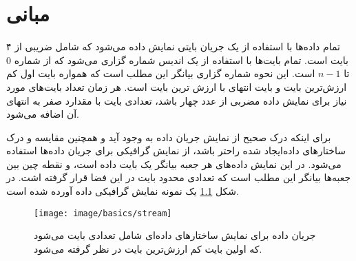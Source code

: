 \chapter{مبانی}

% 

تمام داده‌ها با استفاده از یک جریان بایتی نمایش داده می‌شود که شامل ضریبی از ۴
بایت است.
تمام بایت‌ها با استفاده از یک اندیس شماره گزاری می‌شود که از شماره $0$ تا $n-1$
است.
این نحوه شماره گزاری بیانگر این مطلب است که همواره بایت اول کم ارزش‌ترین بایت
و بایت انتهای با ارزش ترین بایت است.
هر زمان تعداد بایت‌های مورد نیاز برای نمایش داده مضربی از عدد چهار باشد، تعدادی
بایت با مقدارد صفر به انتهای آن اضافه می‌شود.
 

برای اینکه درک صحیح از نمایش جریان داده به وجود آید و همچنین مقایسه و درک
ساختارهای داده‌ایجاد شده راحتر باشد، از نمایش گرافیکی برای جریان داده‌ها استفاده
می‌شود.
در این نمایش داده‌های هر جعبه بیانگر یک بایت داده است،  و نقطه چین بین جعبه‌ها
بیانگر این مطلب است که تعدادی محدود بایت در این فضا قرار گرفته اشت.
در شکل \ref{image/basics/stream} یک نمونه نمایش گرافیکی داده آورده شده است.


\begin{figure}
\centering
\texttt{[image: image/basics/stream]}
\caption[ساختار یک جریان داده]{
	جریان داده برای نمایش ساختارهای داده‌ای شامل تعدادی بایت می‌شود که اولین بایت
	کم ارزش‌ترین بایت در نظر گرفته می‌شود.
}
\label{image/basics/stream}
\end{figure}